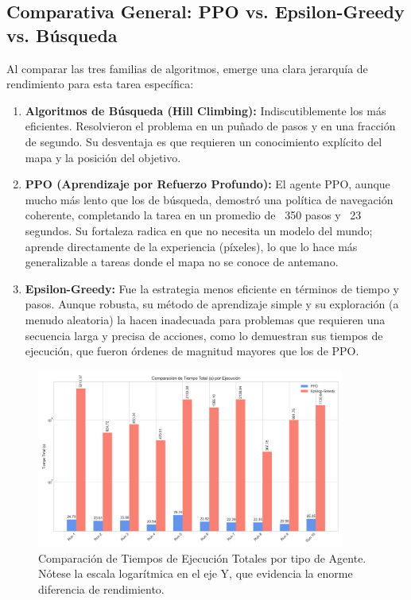 \documentclass[12pt, oneside, openany]{book}
\begin{document}
\subsection{Comparativa General: PPO vs. Epsilon-Greedy vs. Búsqueda}
Al comparar las tres familias de algoritmos, emerge una clara jerarquía de rendimiento para esta tarea específica:
\begin{enumerate}
    \item \textbf{Algoritmos de Búsqueda (Hill Climbing):} Indiscutiblemente los más eficientes. Resolvieron el problema en un puñado de pasos y en una fracción de segundo. Su desventaja es que requieren un conocimiento explícito del mapa y la posición del objetivo.
    \item \textbf{PPO (Aprendizaje por Refuerzo Profundo):} El agente PPO, aunque mucho más lento que los de búsqueda, demostró una política de navegación coherente, completando la tarea en un promedio de ~350 pasos y ~23 segundos. Su fortaleza radica en que no necesita un modelo del mundo; aprende directamente de la experiencia (píxeles), lo que lo hace más generalizable a tareas donde el mapa no se conoce de antemano.
    \item \textbf{Epsilon-Greedy:} Fue la estrategia menos eficiente en términos de tiempo y pasos. Aunque robusta, su método de aprendizaje simple y su exploración (a menudo aleatoria) la hacen inadecuada para problemas que requieren una secuencia larga y precisa de acciones, como lo demuestran sus tiempos de ejecución, que fueron órdenes de magnitud mayores que los de PPO.
\end{enumerate}

\begin{figure}[H]
    \centering
    \includegraphics[width=0.9\textwidth]{informe_visuals/tiempo_comparacion.png}
    \caption{Comparación de Tiempos de Ejecución Totales por tipo de Agente. Nótese la escala logarítmica en el eje Y, que evidencia la enorme diferencia de rendimiento.}
    \label{fig:tiempo_comparacion_general}
\end{figure}
\end{document}
